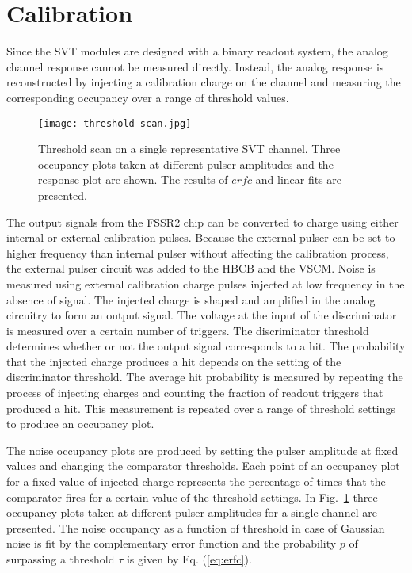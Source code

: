 \section{Calibration}

Since the SVT modules are designed with a binary readout system, the analog channel response cannot be measured directly. Instead, the analog response is reconstructed by injecting a calibration charge on the channel and measuring the corresponding occupancy over a range of threshold values. 

\begin{figure}[hbt] 
	\centering 
	\texttt{[image: threshold-scan.jpg]}
	\caption{Threshold scan on a single representative SVT channel. Three occupancy plots taken at different pulser amplitudes and the response plot are shown. The results of $erfc$ and linear fits are presented.}
	\label{fig:threshold-scan}
\end{figure}

The output signals from the FSSR2 chip can be converted to charge using either internal or external calibration pulses. Because the external pulser can be set to higher frequency than internal pulser without affecting the calibration process, the external pulser circuit was added to the HBCB and the VSCM. Noise is measured using external calibration charge pulses injected at low frequency in the absence of signal. The injected charge is shaped and amplified in the analog circuitry to form an output signal. The voltage at the input of the discriminator is measured over a certain number of triggers. The discriminator threshold determines whether or not the output signal corresponds to a hit. The probability that the injected charge produces a hit depends on the setting of the discriminator threshold. The average hit probability is measured by repeating the process of injecting charges and counting the fraction of readout triggers that produced a hit. This measurement is repeated over a range of threshold settings to produce an occupancy plot. 

The noise occupancy plots are produced by setting the pulser amplitude at fixed values and changing the comparator thresholds. Each point of an occupancy plot for a fixed value of injected charge represents the percentage of times that the comparator fires for a certain value of the threshold settings. In Fig.~\ref{fig:threshold-scan} three occupancy plots taken at different pulser amplitudes for a single channel are presented. The noise occupancy as a function of threshold in case of Gaussian noise is fit by the complementary error function and the probability $p$ of surpassing a threshold $\tau$ is given by Eq. (\ref{eq:erfc}). 

